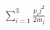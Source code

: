 \documentclass[preview]{standalone}
\begin{document}
\begin{align*}
\sum_{i=1}^3\frac{p_ij^2}{2m_j}
\end{align*}
\end{document}
